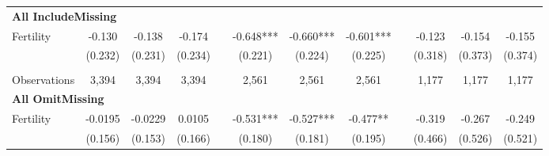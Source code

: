 \begin{landscape}
\begin{table}[htpb!]
\begin{center}
\begin{tabular}{lcccp{2mm}cccp{2mm}ccc}
\multicolumn{12}{l}{\textbf{All IncludeMissing}}\\ 
Fertility&-0.130&-0.138&-0.174&&-0.648***&-0.660***&-0.601***&&-0.123&-0.154&-0.155\\
&(0.232)&(0.231)&(0.234)&&(0.221)&(0.224)&(0.225)&&(0.318)&(0.373)&(0.374)\\
\begin{footnotesize}\end{footnotesize}&\begin{footnotesize}\end{footnotesize}&\begin{footnotesize}\end{footnotesize}&\begin{footnotesize}\end{footnotesize}&\begin{footnotesize}\end{footnotesize}&\begin{footnotesize}\end{footnotesize}&\begin{footnotesize}\end{footnotesize}&\begin{footnotesize}\end{footnotesize}&\begin{footnotesize}\end{footnotesize}&\begin{footnotesize}\end{footnotesize}&\begin{footnotesize}\end{footnotesize}&\begin{footnotesize}\end{footnotesize}\\Observations&3,394&3,394&3,394&&2,561&2,561&2,561&&1,177&1,177&1,177\\
\multicolumn{12}{l}{\textbf{All OmitMissing}}\\ 
Fertility&-0.0195&-0.0229&0.0105&&-0.531***&-0.527***&-0.477**&&-0.319&-0.267&-0.249\\
&(0.156)&(0.153)&(0.166)&&(0.180)&(0.181)&(0.195)&&(0.466)&(0.526)&(0.521)\\

\end{tabular}
\end{center}
\end{table}
\end{landscape}

